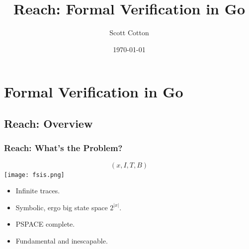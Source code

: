 \documentclass{beamer}
\author{Scott Cotton}
\title{Reach: Formal Verification in Go}
\institute{Independent}
\date{\today}
\begin{document}
\begin{frame}
\titlepage
\end{frame}

\section{Formal Verification in Go}

\subsection{Reach: Overview}
\begin{frame}
	\frametitle{Reach: What's the Problem?}
	\begin{center}
		\large{$$(x,I,T,B)$$}
	\texttt{[image: fsis.png]}

	\begin{itemize}
		\item Infinite traces.
		\item Symbolic, ergo big state space $2^{|x|}$.
		\item PSPACE complete.
		\item Fundamental and inescapable.
	\end{itemize}
	\end{center}

\end{frame}
\end{document}
